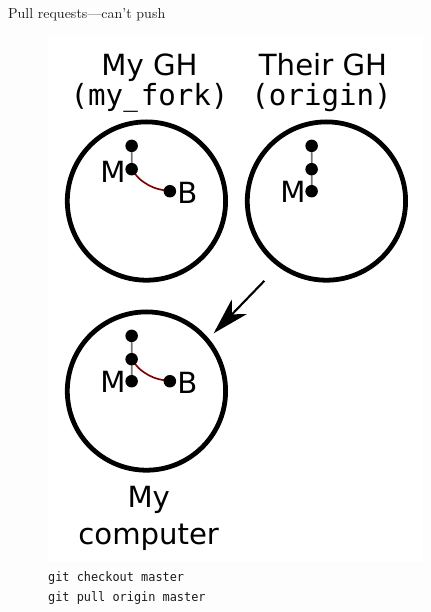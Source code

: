 \begin{frame}{Pull requests---can't push}
  \begin{figure}
    \includegraphics{fork_007.pdf}
    \\ \texttt{git checkout master}
    \\ \texttt{git pull origin master}
  \end{figure}
\end{frame}

